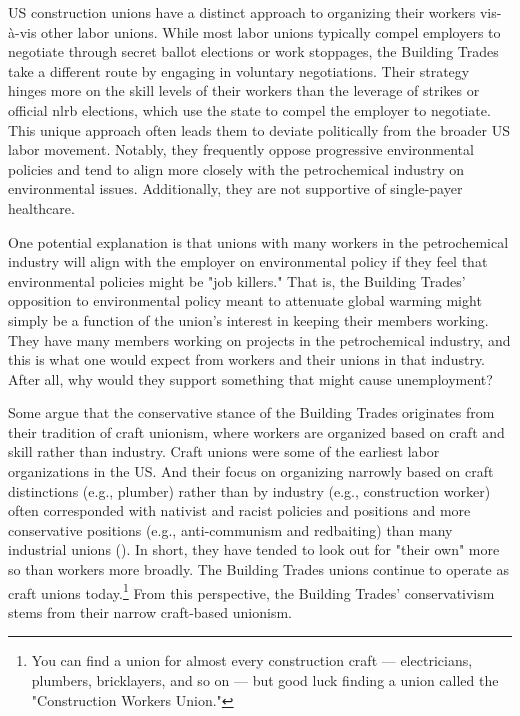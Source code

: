 \documentclass[12pt]{article}
\begin{document}

US construction unions have a distinct approach to organizing their workers vis-à-vis other labor unions. While most labor unions typically compel employers to negotiate through secret ballot elections or work stoppages, the Building Trades take a different route by engaging in voluntary negotiations. Their strategy hinges more on the skill levels of their workers than the leverage of strikes or official \acrfull{nlrb} elections, which use the state to compel the employer to negotiate. This unique approach often leads them to deviate politically from the broader US labor movement. Notably, they frequently oppose progressive environmental policies and tend to align more closely with the petrochemical industry on environmental issues. Additionally, they are not supportive of single-payer healthcare.

One potential explanation is that unions with many workers in the petrochemical industry will align with the employer on environmental policy if they feel that environmental policies might be "job killers." That is, the Building Trades' opposition to environmental policy meant to attenuate global warming might simply be a function of the union's interest in keeping their members working. They have many members working on projects in the petrochemical industry, and this is what one would expect from workers and their unions in that industry. After all, why would they support something that might cause unemployment?

Some argue that the conservative stance of the Building Trades originates from their tradition of craft unionism, where workers are organized based on craft and skill rather than industry. Craft unions were some of the earliest labor organizations in the US. And their focus on organizing narrowly based on craft distinctions (e.g., plumber) rather than by industry (e.g., construction worker) often corresponded with nativist and racist policies and positions and more conservative positions (e.g., anti-communism and redbaiting) than many industrial unions (\cite{foner1994}). In short, they have tended to look out for "their own" more so than workers more broadly. The Building Trades unions continue to operate as craft unions today.\footnote{You can find a union for almost every construction craft --- electricians, plumbers, bricklayers, and so on --- but good luck finding a union called the "Construction Workers Union."} From this perspective, the Building Trades' conservativism stems from their narrow craft-based unionism.
\end{document}
